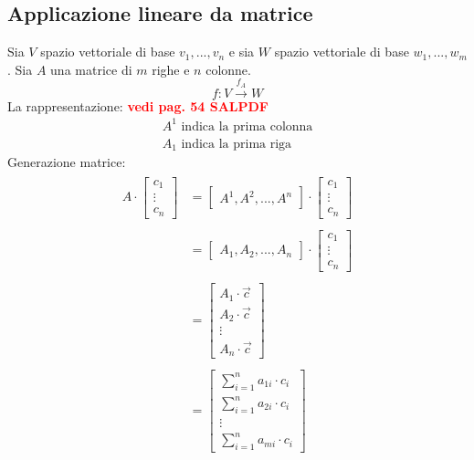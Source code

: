 \documentclass[italian]{article}
\begin{document}
\subsection{Applicazione lineare da matrice}
Sia $V$ spazio vettoriale di base $v_1, ... , v_n$ e sia $W$ spazio vettoriale di base $w_1, ... , w_m$. Sia $A$ una matrice di $m$ righe e $n$ colonne.
\[
	f: V \xrightarrow{f_A} W
\]
La rappresentazione: \textcolor{red}{\textbf{vedi pag. 54 SALPDF}}
\begin{gather*}
	A^1 \text{ indica la prima colonna} \\ 
	A_1 \text{ indica la prima riga}
\end{gather*}
Generazione matrice:
\begin{gather*}
	\begin{split}
		A\cdot
		\begin{bmatrix}
		c_1 \\ \vdots \\ c_n
		\end{bmatrix}
		&= 
		\begin{bmatrix}
			A^1,A^2, ..., A^n
		\end{bmatrix}
		\cdot
		\begin{bmatrix}
			c_1 \\ \vdots \\ c_n
		\end{bmatrix} \\\\
		&= 
		\begin{bmatrix}
			A_1, A_2, ... , A_n
		\end{bmatrix}
		\cdot
		\begin{bmatrix}
			c_1 \\ \vdots \\ c_n
		\end{bmatrix} \\\\
		&=
		\begin{bmatrix}
			A_1 \cdot \vec{c} \\
			A_2 \cdot \vec{c} \\
			\vdots \\
			A_n \cdot \vec{c}		
		\end{bmatrix} \\\\
		&= 
		\begin{bmatrix}
			\sum_{i=1}^{n} a_{1i} \cdot c_i \\
			\sum_{i=1}^{n} a_{2i} \cdot c_i \\
			\vdots \\
			\sum_{i=1}^{n} a_{mi} \cdot c_i
		\end{bmatrix}
	\end{split}
\end{gather*}
\end{document}
